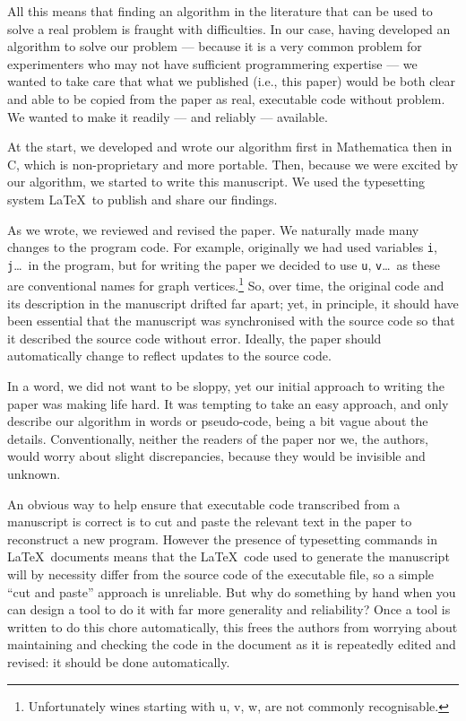 \documentclass[12pt]{article}
\begin{document}
All this means that finding an algorithm in the literature that can be used to solve a real problem is fraught with difficulties. In our case, having developed an algorithm to solve our problem --- because it is a very common problem for experimenters who may not have sufficient programmering expertise --- we wanted to take care that what we published (i.e., this paper) would be both clear and able to be copied from the paper as real, executable code without problem. We wanted to make it readily --- and reliably --- available.

At the start, we developed and wrote our algorithm first in Mathematica then in C, which is non-proprietary and more portable. Then, because we were excited by our algorithm, we started to write this manuscript. We used the typesetting system \LaTeX\ to publish and share our findings.

As we wrote, we reviewed and revised the paper. We naturally made many changes to the program code. For example, originally we had used variables \texttt{i}, \texttt{j}\ldots\ in the program, but for writing the paper we decided to use \texttt{u}, \texttt{v}\ldots\ as these are conventional names for graph vertices.\footnote{Unfortunately wines starting with u, v, w, are not commonly recognisable.} So, over time, the original code and its description in the manuscript drifted far apart; yet, in principle, it should have been essential that the manuscript was synchronised with the source code so that it described the source code without error. Ideally, the paper should automatically change to reflect updates to the source code.

In a word, we did not want to be sloppy, yet our initial approach to writing the paper was making life hard. It was tempting to take an easy approach, and only describe our algorithm in words or pseudo-code, being a bit vague about the details. Conventionally, neither the readers of the paper nor we, the authors, would worry about slight discrepancies, because they would be invisible and unknown.

An obvious way to help ensure that executable code transcribed from a manuscript is correct is to cut and paste the relevant text in the paper to reconstruct a new program. However the presence of typesetting commands in \LaTeX\ documents means that the \LaTeX\ code used to generate the manuscript will by necessity differ from the source code of the executable file, so a simple ``cut and paste'' approach is unreliable. But why do something by hand when you can design a tool to do it with far more generality and reliability? Once a tool is written to do this chore automatically, this frees the authors from worrying about maintaining and checking the code in the document as it is repeatedly edited and revised: it should be done automatically.
\end{document}
